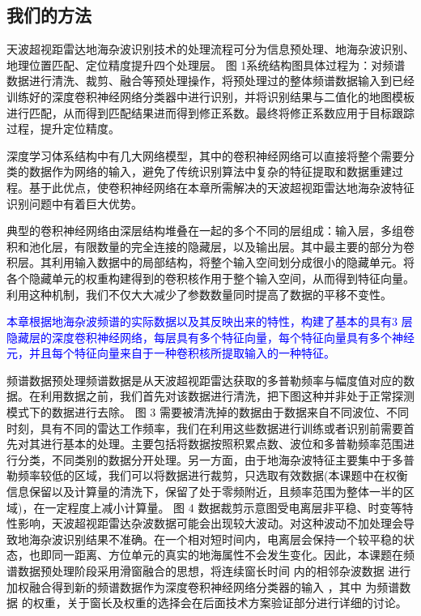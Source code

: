 \subsection{我们的方法}
天波超视距雷达地海杂波识别技术的处理流程可分为信息预处理、地海杂波识别、地理位置匹配、定位精度提升四个处理层。 图 1系统结构图具体过程为：对频谱数据进行清洗、裁剪、融合等预处理操作，将预处理过的整体频谱数据输入到已经训练好的深度卷积神经网络分类器中进行识别，并将识别结果与二值化的地图模板进行匹配，从而得到匹配结果进而得到修正系数。最终将修正系数应用于目标跟踪过程，提升定位精度。

深度学习体系结构中有几大网络模型，其中的卷积神经网络可以直接将整个需要分类的数据作为网络的输入，避免了传统识别算法中复杂的特征提取和数据重建过程。基于此优点，使卷积神经网络在本章所需解决的天波超视距雷达地海杂波特征识别问题中有着巨大优势。

典型的卷积神经网络由深层结构堆叠在一起的多个不同的层组成：输入层，多组卷积和池化层，有限数量的完全连接的隐藏层，以及输出层。其中最主要的部分为卷积层。其利用输入数据中的局部结构，将整个输入空间划分成很小的隐藏单元。将各个隐藏单元的权重构建得到的卷积核作用于整个输入空间，从而得到特征向量。利用这种机制，我们不仅大大减少了参数数量同时提高了数据的平移不变性。

\textcolor{blue}{本章根据地海杂波频谱的实际数据以及其反映出来的特性，构建了基本的具有3 层隐藏层的深度卷积神经网络，每层具有多个特征向量，每个特征向量具有多个神经元，并且每个特征向量来自于一种卷积核所提取输入的一种特征。
}

频谱数据预处理频谱数据是从天波超视距雷达获取的多普勒频率与幅度值对应的数据。在利用数据之前，我们首先对该数据进行清洗，把下图这种并非处于正常探测模式下的数据进行去除。 图 3 需要被清洗掉的数据由于数据来自不同波位、不同时刻，具有不同的雷达工作频率，我们在利用这些数据进行训练或者识别前需要首先对其进行基本的处理。主要包括将数据按照积累点数、波位和多普勒频率范围进行分类，不同类别的数据分开处理。另一方面，由于地海杂波特征主要集中于多普勒频率较低的区域，我们可以将数据进行裁剪，只选取有效数据(本课题中在权衡信息保留以及计算量的清洗下，保留了处于零频附近，且频率范围为整体一半的区域)，在一定程度上减小计算量。 图 4 数据裁剪示意图受电离层非平稳、时变等特性影响，天波超视距雷达杂波数据可能会出现较大波动。对这种波动不加处理会导致地海杂波识别结果不准确。在一个相对短时间内，电离层会保持一个较平稳的状态，也即同一距离、方位单元的真实的地海属性不会发生变化。因此，本课题在频谱数据预处理阶段采用滑窗融合的思想，将连续窗长时间 内的相邻杂波数据 进行加权融合得到新的频谱数据作为深度卷积神经网络分类器的输入 ，其中 为频谱数据 的权重，关于窗长及权重的选择会在后面技术方案验证部分进行详细的讨论。

